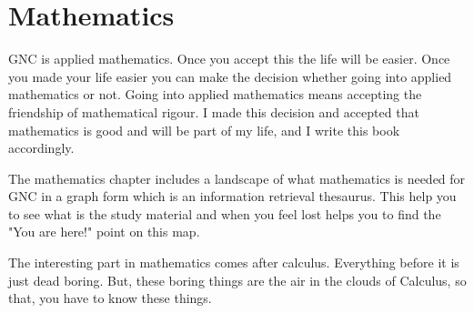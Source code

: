 \part{Mathematics}

GNC is applied mathematics. Once you accept this the life will be easier. Once
you made your life easier you can make the decision whether going into applied
mathematics or not. Going into applied mathematics means accepting the
friendship of mathematical rigour. I made this decision and accepted that
mathematics is good and will be part of my life, and I write this book
accordingly.

The mathematics chapter includes a landscape of what mathematics is needed for
GNC in a graph form which is an information retrieval thesaurus. This help you
to see what is the study material and when you feel lost helps you to find the
"You are here!" point on this map.

The interesting part in mathematics comes after calculus. Everything before it
is just dead boring. But, these boring things are the air in the clouds of
Calculus, so that, you have to know these things.



